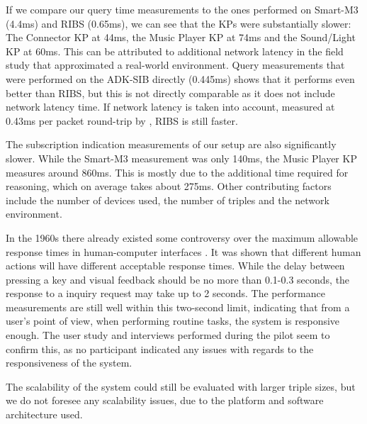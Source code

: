 
If we compare our query time measurements to the ones performed on Smart-M3 (4.4ms) and \ac{RIBS} (0.65ms), we can see that the \acp{KP} were substantially slower: The Connector \ac{KP} at 44ms, the Music Player \ac{KP} at 74ms and the Sound/Light \ac{KP} at 60ms. This can be attributed to additional network latency in the field study that approximated a real-world environment. Query measurements that were performed on the ADK-SIB directly (0.445ms) shows that it performs even better than \ac{RIBS}, but this is not directly comparable as it does not include network latency time. If network latency is taken into account, measured at 0.43ms per packet round-trip by \cite{Etelapera2011}, \ac{RIBS} is still faster.

The subscription indication measurements of our setup are also significantly slower. While the Smart-M3 measurement was only 140ms, the Music Player \ac{KP} measures around 860ms. This is mostly due to the additional time required for reasoning, which on average takes about 275ms. Other contributing factors include the number of devices used, the number of triples and the network environment.

In the 1960s there already existed some controversy over the maximum allowable response times in human-computer interfaces \cite{Miller1968}. It was shown that different human actions will have different acceptable response times. While the delay between pressing a key and visual feedback should be no more than 0.1-0.3 seconds, the response to a inquiry request may take up to 2 seconds. The performance measurements are still well within this two-second limit, indicating that from a user's point of view, when performing routine tasks, the system is responsive enough. The user study and interviews performed during the pilot seem to confirm this, as no participant indicated any issues with regards to the responsiveness of the system.

The scalability of the system could still be evaluated with larger triple sizes, but we do not foresee any scalability issues, due to the platform and software architecture used. 

